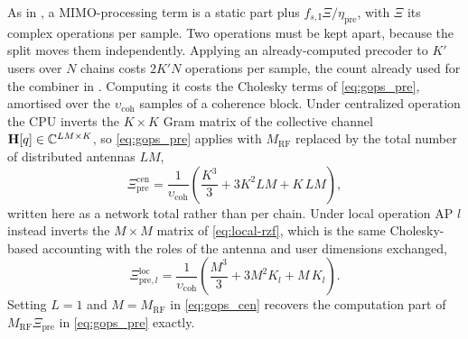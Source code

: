 As in , a MIMO-processing term is a static part plus
$f_{s,\mathrm{I}}\Xi/\eta_{\mathrm{pre}}$, with $\Xi$ its complex operations per
sample. Two operations must be kept apart, because the split moves them
independently. Applying an already-computed precoder to $K'$ users over $N$
chains costs $2K'N$ operations per sample, the count already used for the
combiner in . Computing it costs the Cholesky terms of
\eqref{eq:gops_pre}, amortised over the $\upsilon_{\mathrm{coh}}$ samples of a
coherence block. Under centralized operation the CPU inverts the $K\times K$ Gram
matrix of the collective channel $\boldsymbol{\mathrm{H}}[q]\in\mathbb{C}^{LM\times K}$, so
\eqref{eq:gops_pre} applies with $M_{\mathrm{RF}}$ replaced by the total number
of distributed antennas $LM$,
\begin{equation}
\label{eq:gops_cen}
\Xi_{\mathrm{pre}}^{\mathrm{cen}} =
\frac{1}{\upsilon_{\mathrm{coh}}}\left(\frac{K^{3}}{3}
+ 3K^{2}LM + K\,LM\right),
\end{equation}
written here as a network total rather than per chain. Under local operation AP
$l$ instead inverts the $M\times M$ matrix of \eqref{eq:local-rzf}, which is the
same Cholesky-based accounting with the roles of the antenna and user dimensions
exchanged,
\begin{equation}
\label{eq:gops_loc}
\Xi_{\mathrm{pre},l}^{\mathrm{loc}} =
\frac{1}{\upsilon_{\mathrm{coh}}}\left(\frac{M^{3}}{3}
+ 3M^{2}K_{l} + M\,K_{l}\right).
\end{equation}
Setting $L=1$ and $M=M_{\mathrm{RF}}$ in \eqref{eq:gops_cen} recovers the
computation part of $M_{\mathrm{RF}}\Xi_{\mathrm{pre}}$ in \eqref{eq:gops_pre}
exactly.


